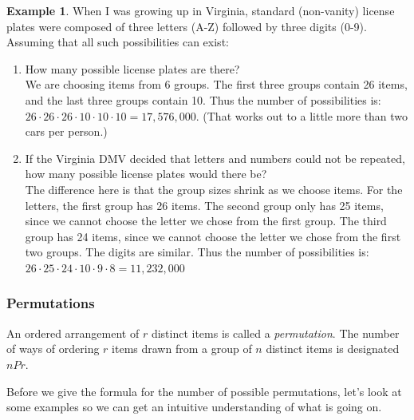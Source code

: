 \documentclass[12pt]{article}
\theoremstyle{definition}
\newtheorem*{example}{Example}
\theoremstyle{remark}
\begin{document}
\begin{example}When I was growing up in Virginia, standard (non-vanity) license plates were composed of three letters (A-Z) followed by three digits (0-9). Assuming that all such possibilities can exist:
\begin{enumerate}
\item How many possible license plates are there? \\

We are choosing items from 6 groups. The first three groups contain 26 items, and the last three groups contain 10. Thus the number of possibilities is: $26 \cdot 26 \cdot 26 \cdot 10 \cdot 10 \cdot 10 = 17,576,000$. (That works out to a little more than two cars per person.)
\item If the Virginia DMV decided that letters and numbers could not be repeated, how many possible license plates would there be?\\

The difference here is that the group sizes shrink as we choose items. For the letters, the first group has 26 items. The second group only has 25 items, since we cannot choose the letter we chose from the first group. The third group has 24 items, since we cannot choose the letter we chose from the first two groups. The digits are similar. Thus the number of possibilities is: $26 \cdot 25 \cdot 24 \cdot 10 \cdot 9 \cdot 8 = 11,232,000$
\end{enumerate}
\end{example}

\subsubsection{Permutations}

\begin{framed}
An ordered arrangement of $r$ distinct items is called a \emph{permutation}. The number of ways of ordering $r$ items drawn from a group of $n$ distinct items is designated $nPr$.
\end{framed}

Before we give the formula for the number of possible permutations, let's look at some examples so we can get an intuitive understanding of what is going on.
\end{document}
